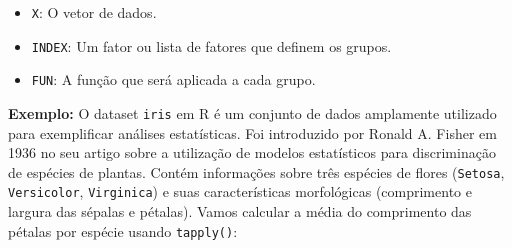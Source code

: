 \documentclass[
]{book}
\begin{document}
\begin{itemize}
\item
  \texttt{X}: O vetor de dados.
\item
  \texttt{INDEX}: Um fator ou lista de fatores que definem os grupos.
\item
  \texttt{FUN}: A função que será aplicada a cada grupo.
\end{itemize}

\textbf{Exemplo:} O dataset \texttt{iris} em R é um conjunto de dados amplamente
utilizado para exemplificar análises estatísticas. Foi introduzido por
Ronald A. Fisher em 1936 no seu artigo sobre a utilização de modelos
estatísticos para discriminação de espécies de plantas. Contém
informações sobre três espécies de flores (\texttt{Setosa}, \texttt{Versicolor},
\texttt{Virginica}) e suas características morfológicas (comprimento e largura
das sépalas e pétalas). Vamos calcular a média do comprimento das
pétalas por espécie usando \texttt{tapply()}:
\end{document}
